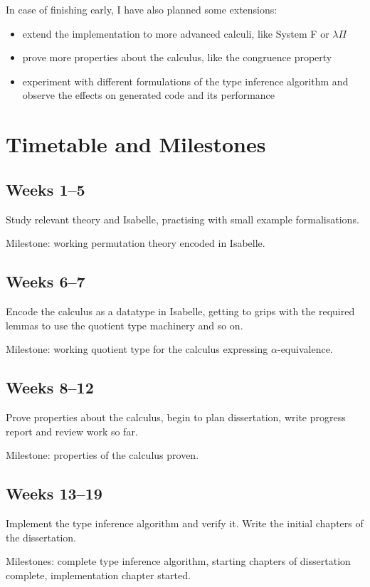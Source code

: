 \documentclass[12pt]{article}
\begin{document}
In case of finishing early, I have also planned some extensions:
\begin{itemize}
\item
extend the implementation to more advanced calculi, like System F or \(\lambda\Pi\)
\item
prove more properties about the calculus, like the congruence property
\item
experiment with different formulations of the type inference algorithm and observe the effects on generated code and its performance
\end{itemize}
\section*{Timetable and Milestones}
\subsection*{Weeks 1--5}
Study relevant theory and Isabelle, practising with small example formalisations.

Milestone: working permutation theory encoded in Isabelle.

\subsection*{Weeks 6--7}
Encode the calculus as a datatype in Isabelle, getting to grips with the required lemmas to use the quotient type machinery and so on.

Milestone: working quotient type for the calculus expressing \(\alpha\)-equivalence.

\subsection*{Weeks 8--12}
Prove properties about the calculus, begin to plan dissertation, write progress report and review work so far.

Milestone: properties of the calculus proven.

\subsection*{Weeks 13--19}
Implement the type inference algorithm and verify it.
Write the initial chapters of the dissertation.

Milestones: complete type inference algorithm, starting chapters of dissertation complete, implementation chapter started.
\end{document}
